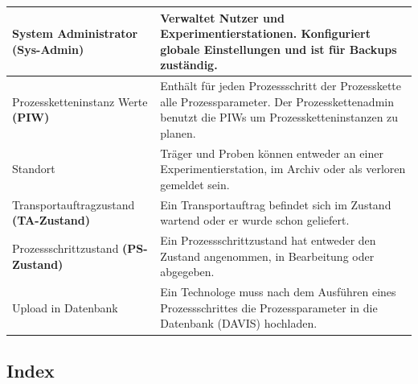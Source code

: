 \documentclass[enabledeprecatedfontcommands,fontsize=12pt,paper=a4,twoside]{scrartcl}
\begin{document}
\begin{longtable}[c]{|p{7cm}|p{8cm}|}
System Administrator \textbf{(Sys-Admin)}      & Verwaltet Nutzer und Experimentierstationen. Konfiguriert globale Einstellungen und ist für Backups zuständig.                                                                                                                                         \\ \hline
Prozessketteninstanz Werte \textbf{(PIW)}      & Enthält für jeden Prozessschritt der Prozesskette alle Prozessparameter. Der Prozesskettenadmin benutzt die PIWs um Prozessketteninstanzen zu planen.                                                                                                 \\ \hline
Standort                                                        & Träger und Proben können entweder an einer Experimentierstation, im Archiv oder als verloren gemeldet sein.                                                                                                                                           \\ \hline
Transportauftragzustand \textbf{(TA-Zustand)}  & Ein Transportauftrag befindet sich im Zustand wartend oder er wurde schon geliefert.                                                                                                                                                                  \\ \hline
Prozessschrittzustand \textbf{(PS-Zustand)}    & Ein Prozessschrittzustand hat entweder den Zustand angenommen, in Bearbeitung oder abgegeben.                                                                                                                                                         \\ \hline
Upload in Datenbank                                             & Ein Technologe muss nach dem Ausführen eines Prozessschrittes die Prozessparameter in die Datenbank (DAVIS) hochladen.                                                                                                                                \\ \hline
\end{longtable}
\subsection{Index}
\end{document}

